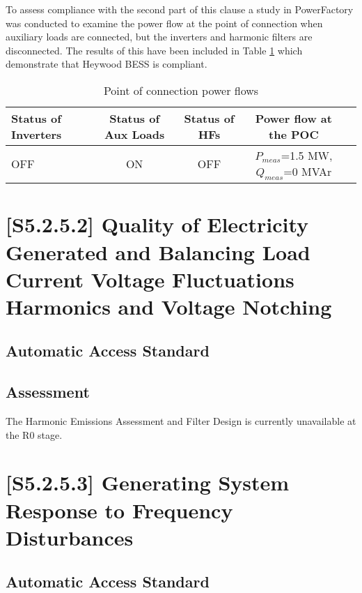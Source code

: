 \documentclass{../grid-link-report}
\newcommand{\projectassetsdir}{../project-assets}
\begin{document}
	To assess compliance with the second part of this clause a study in PowerFactory was conducted to examine the power flow at the point of connection when auxiliary loads are connected, but the inverters and harmonic filters are disconnected. The results of this have been included in Table \ref{tab:5251-poc-flows} which demonstrate that Heywood BESS is compliant.
	
	\begin{table}[H]
		\centering
		\caption{Point of connection power flows}
		\label{tab:5251-poc-flows}
		\begin{tabular}{|l|c|c|c|c|}
			\hline
			\textbf{Status of Inverters} & \textbf{Status of Aux Loads}  & \textbf{Status of HFs} & \textbf{Power flow at the POC} \\
			\hline
			OFF & ON	& OFF & $P_{meas}$=1.5 MW, $Q_{meas}$=0 MVAr \\
			\hline
		\end{tabular}			
	\end{table}	
	
	
	\section{[S5.2.5.2] Quality of Electricity Generated and Balancing Load Current Voltage Fluctuations Harmonics and Voltage Notching}	
	\subsection{Automatic Access Standard}
	\begin{tcolorbox}[lightgreenbox]
		
	\end{tcolorbox}
	\subsection{Assessment}
	The Harmonic Emissions Assessment and Filter Design is currently unavailable at the R0 stage.
	
	\section{[S5.2.5.3] Generating System Response to Frequency Disturbances}
	\subsection{Automatic Access Standard}
	\begin{tcolorbox}[lightgreenbox]
		
	\end{tcolorbox}
	
\end{document}

